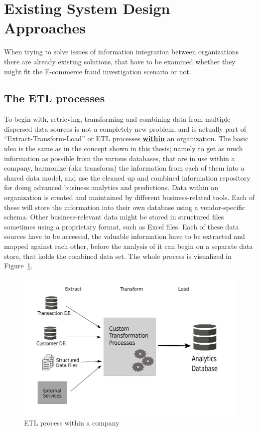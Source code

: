 
\section{Existing System Design Approaches}
\label{sec:system_approaches}

When trying to solve issues of information integration between organizations there are already existing solutions, that have to be examined whether they might fit the \gls{E-commerce} fraud investigation scenario or not.

\subsection{The \gls{ETL} processes}
\label{subsec:etl_process}

To begin with, retrieving, transforming and combining data from multiple dispersed data sources is not a completely new problem, and is actually part of ``Extract-Transform-Load'' or \gls{ETL} processes \textbf{\underline{within}} an organization. The basic idea is the same as in the concept shown in this thesis; namely to get as much information as possible from the various databases, that are in use within a company, harmonize (aka transform) the information from each of them into a shared data model, and use the cleaned up and combined information repository for doing advanced business analytics and predictions. Data within an organization is created and maintained by different business-related tools. Each of these will store the information into their own database using a vendor-specific schema. Other business-relevant data might be stored in structured files sometimes using a proprietary format, such as Excel files. Each of these data sources have to be accessed, the valuable information have to be extracted and mapped against each other, before the analysis of it can begin on a separate data store, that holds the combined data set. The whole process is visualized in Figure~\ref{fig:images_etl_process}. \\

\begin{figure}[!ht]
  \centering
  \includegraphics[width=0.9\columnwidth]{images/etl_process.pdf}
  \caption[ETL process within a company]{\gls{ETL} process within a company \citep[pg. 165]{wood2014linked}}
\label{fig:images_etl_process}
\end{figure}

